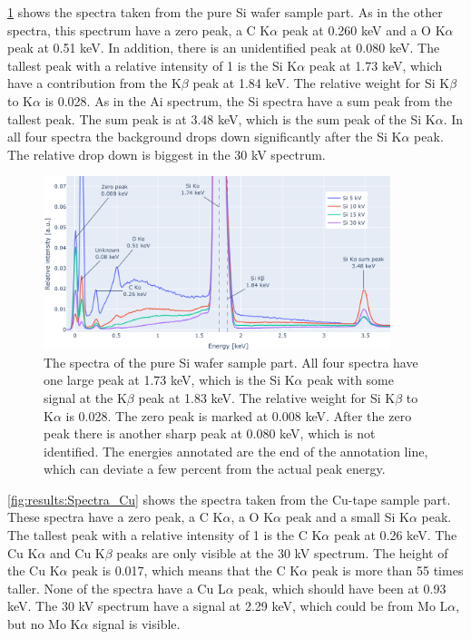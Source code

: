 \cref{fig:results:Spectra_Si} shows the spectra taken from the pure Si wafer sample part.
As in the other spectra, this spectrum have a zero peak, a C K$\alpha$ peak at 0.260 keV and a O K$\alpha$ peak at 0.51 keV.
In addition, there is an unidentified peak at 0.080 keV.
The tallest peak with a relative intensity of 1 is the Si K$\alpha$ peak at 1.73 keV, which have a contribution from the K$\beta$ peak at 1.84 keV.
The relative weight for Si K$\beta$ to K$\alpha$ is 0.028.
As in the Ai spectrum, the Si spectra have a sum peak from the tallest peak.
The sum peak is at 3.48 keV, which is the sum peak of the Si K$\alpha$.
In all four spectra the background drops down significantly after the Si K$\alpha$ peak.
The relative drop down is biggest in the 30 kV spectrum.

\begin{figure}[h]
    \centering
    \includegraphics[width=0.90\textwidth]{figures/each_spectra_not_on_github/Si_everything.png}
    \caption{
        The spectra of the pure Si wafer sample part.
        All four spectra have one large peak at 1.73 keV, which is the Si K$\alpha$ peak with some signal at the K$\beta$ peak at 1.83 keV.
        The relative weight for Si K$\beta$ to K$\alpha$ is 0.028.
        The zero peak is marked at 0.008 keV.
        After the zero peak there is another sharp peak at 0.080 keV, which is not identified.
        The energies annotated are the end of the annotation line, which can deviate a few percent from the actual peak energy.
    }
    \label{fig:results:Spectra_Si}
\end{figure}


\cref{fig:results:Spectra_Cu} shows the spectra taken from the Cu-tape sample part.
These spectra have a zero peak, a C K$\alpha$, a O K$\alpha$ peak and a small Si K$\alpha$ peak.
The tallest peak with a relative intensity of 1 is the C K$\alpha$ peak at 0.26 keV.
The Cu K$\alpha$ and Cu K$\beta$ peaks are only visible at the 30 kV spectrum.
The height of the Cu K$\alpha$ peak is 0.017, which means that the C K$\alpha$ peak is more than 55 times taller.
None of the spectra have a Cu L$\alpha$ peak, which should have been at 0.93 keV.
The 30 kV spectrum have a signal at 2.29 keV, which could be from Mo L$\alpha$, but no Mo K$\alpha$ signal is visible.

